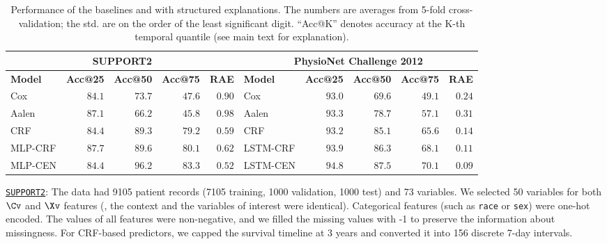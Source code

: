\documentclass[twoside,11pt]{article}
\begin{document}
\begin{table*}[t!]
    \centering
    \caption{\small Performance of the baselines and {\CENs} with structured explanations.
    The numbers are averages from 5-fold cross-validation; the std. are on the order of the least significant digit.
    ``Acc@K'' denotes accuracy at the K-th temporal quantile (see main text for explanation).}
    \vspace{-1ex}
    \fontsize{8}{10}\selectfont
    \def\arraystretch{1.0}
    \begin{tabular}[t]{@{}lrrrr|lrrrr@{}}
        \toprule
        \multicolumn{5}{c|}{\textbf{SUPPORT2}} &
        \multicolumn{5}{c}{\textbf{PhysioNet Challenge 2012}} \\
        \midrule
        \textbf{Model} &
        \textbf{Acc@25} & \textbf{Acc@50} & \textbf{Acc@75} & \textbf{RAE} &
        \textbf{Model} &
        \textbf{Acc@25} & \textbf{Acc@50} & \textbf{Acc@75} & \textbf{RAE} \\
        \midrule
        Cox         & $84.1$    & $73.7$    & $47.6$    & $0.90$    &
        Cox         & $93.0$    & $69.6$    & $49.1$    & $0.24$    \\
        Aalen       & $87.1$    & $66.2$    & $45.8$    & $0.98$    &
        Aalen       & $93.3$    & $78.7$    & $57.1$    & $0.31$    \\
        CRF         & $84.4$    & $89.3$    & $79.2$    & $0.59$    &
        CRF         & $93.2$    & $85.1$    & $65.6$    & $0.14$    \\
        MLP-CRF     & $\mathbf{87.7}$    & $89.6$    & $80.1$    & $0.62$    &
        LSTM-CRF    & $93.9$    & $86.3$    & $68.1$    & $\mathbf{0.11}$    \\
        \midrule
        MLP-CEN     & $84.4$    & $\mathbf{96.2}$    & $\mathbf{83.3}$    & $\mathbf{0.52}$    &
        LSTM-CEN    & $\mathbf{94.8}$    & $\mathbf{87.5}$    & $\mathbf{70.1}$    & $\mathbf{0.09}$    \\
        \bottomrule
    \end{tabular}
    \label{tab:performance-survival}
    \vspace{-3ex}
\end{table*}
 
\underline{\texttt{SUPPORT2}}:
The data had 9105 patient records (7105 training, 1000 validation, 1000 test) and 73 variables.
We selected 50 variables for both $\Cv$ and $\Xv$ features (\ie, the context and the variables of interest were identical).
Categorical features (such as \texttt{race} or \texttt{sex}) were one-hot encoded.
The values of all features were non-negative, and we filled the missing values with -1 to preserve the information about missingness.
For CRF-based predictors, we capped the survival timeline at 3 years and converted it into 156 discrete 7-day intervals.
\end{document}

